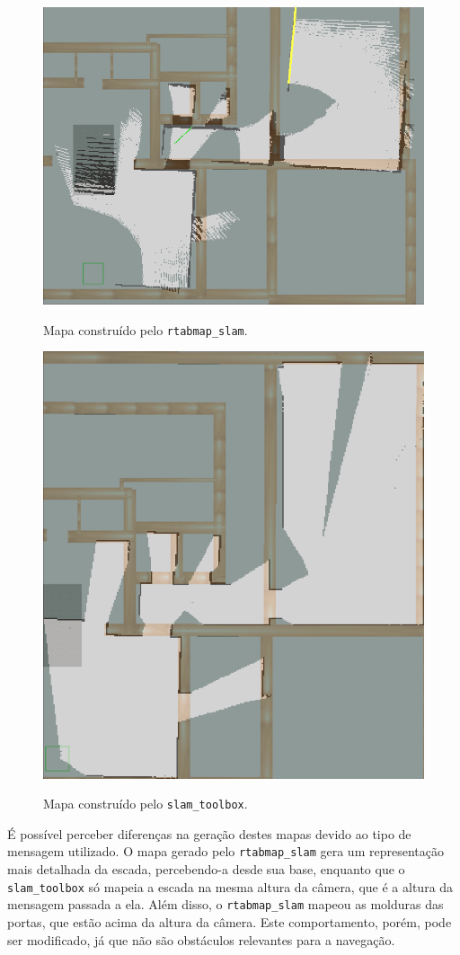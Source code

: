 \documentclass[repeatfields,xlists,xpacks,oneside,yearsonly]{ufrgscca}
\begin{document}
\begin{figure}[h]
    {
        \centering
        \caption{Mapa construído pelo \texttt{rtabmap\_slam}.}
        \label{fig:mapping_rtabmap}
        \includegraphics[width=0.8\linewidth]{rtabmap_slam_map-compared.png}\\
    }
\end{figure}

\begin{figure}[htbp]
    {
        \centering
        \caption{Mapa construído pelo \texttt{slam\_toolbox}.}
        \label{fig:mapping_slam_toolbox}
        \includegraphics[width=0.6\linewidth]{slam_toolbox_map-compared.png}\\
    }
\end{figure}

É possível perceber diferenças na geração destes mapas devido ao tipo de mensagem
utilizado. O mapa gerado pelo \texttt{rtabmap\_slam} gera um representação mais
detalhada da escada, percebendo-a desde sua base, enquanto que o \texttt{slam\_toolbox}
só mapeia a escada na mesma altura da câmera, que é a altura da mensagem passada
a ela.
Além disso, o \texttt{rtabmap\_slam} mapeou as molduras das portas, que estão acima
da altura da câmera. Este comportamento, porém, pode ser modificado, já que
não são obstáculos relevantes para a navegação.
\end{document}
